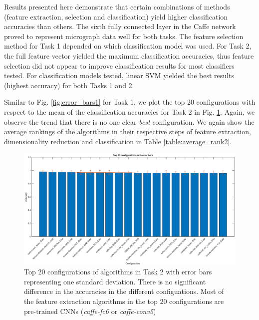 
Results presented here demonstrate that certain combinations of methods (feature extraction, selection and classification) yield higher classification accuracies than others.  
The sixth fully connected layer in the Caffe network proved to represent micrograph data well for both tasks.  The feature selection method for Task 1 depended on which classification model was used.  For Task 2, the full feature vector yielded the maximum classification accuracies, thus feature selection did not appear to improve classification results for most classifiers tested.  For classification models tested, linear SVM yielded the best results (highest accuracy) for both Tasks 1 and 2.  


Similar to Fig. \ref{fig:error_bars1} for Task 1, we plot the top 20 configurations with respect to the mean of the classification accuracies for Task 2 in Fig. \ref{fig:error_bars2}. Again, we observe the trend that there is no one clear \textit{best} configuration. We again show the average rankings of the algorithms in their respective steps of feature extraction, dimensionality reduction and classification in Table \ref{table:average_rank2}. 
\begin{figure}
  \begin{centering}
 \includegraphics[scale=0.4]{img/best_trans_long_error_bars.eps}
 \caption{Top 20 configurations of algorithms in Task 2 with error bars representing one standard deviation. There is no significant difference in the accuracies in the different configuations. Most of the feature extraction algorithms in the top 20 configurations are pre-trained CNNs (\textit{caffe-fc6} or \textit{caffe-conv5})}
 \label{fig:error_bars2}
 \end{centering}
\end{figure}

